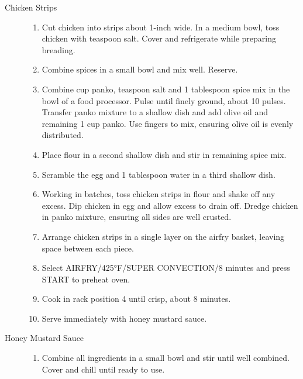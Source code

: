 \begin{description}
  \item[Chicken Strips]\hfill
    \begin{enumerate}
    \item Cut chicken into strips about 1-inch wide. In a medium bowl,
      toss chicken with  teaspoon salt. Cover and refrigerate while
      preparing breading.
    \item Combine spices in a small bowl and mix well. Reserve.
    \item Combine  cup panko,  teaspoon salt and 1 tablespoon spice
      mix in the bowl of a food processor. Pulse until finely ground,
      about 10 pulses. Transfer panko mixture to a shallow dish and add
      olive oil and remaining 1 cup panko. Use fingers to mix, ensuring
      olive oil is evenly distributed.
    \item Place flour in a second shallow dish and stir in remaining spice mix.
    \item Scramble the egg and 1 tablespoon water in a third shallow dish.
    \item Working in batches, toss chicken strips in flour and shake off any excess. Dip chicken in egg and allow excess to drain off. Dredge chicken in panko mixture, ensuring all sides are well crusted.
    \item Arrange chicken strips in a single layer on the airfry basket, leaving space between each piece.
    \item Select AIRFRY/425°F/SUPER CONVECTION/8 minutes and press START to preheat oven.
    \item Cook in rack position 4 until crisp, about 8 minutes.
    \item Serve immediately with honey mustard sauce.
    \end{enumerate}
  \item[Honey Mustard Sauce]\hfill
    \begin{enumerate}
    \item Combine all ingredients in a small bowl and stir until well combined. Cover and chill until ready to use.
    \end{enumerate}
  \end{description}

